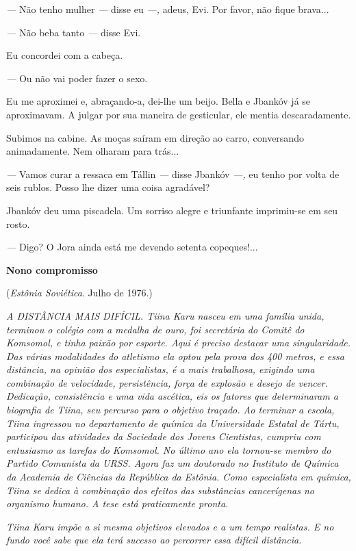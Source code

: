 \emph{---} Não tenho mulher \emph{---} disse eu \emph{---,} adeus, Evi.
Por favor, não fique brava...

\emph{---} Não beba tanto \emph{---} disse Evi.

Eu concordei com a cabeça.

\emph{---} Ou não vai poder fazer o sexo.

Eu me aproximei e, abraçando-a, dei-lhe um beijo. Bella e Jbankóv já se
aproximavam. A julgar por sua maneira de gesticular, ele mentia
descaradamente.

Subimos na cabine. As moças saíram em direção ao carro, conversando
animadamente. Nem olharam para trás...

\emph{---} Vamos curar a ressaca em Tállin \emph{---} disse Jbankóv
\emph{---,} eu tenho por volta de seis rublos. Posso lhe dizer uma coisa
agradável?

Jbankóv deu uma piscadela. Um sorriso alegre e triunfante imprimiu-se em
seu rosto.

\emph{---} Digo? O Jora ainda está me devendo setenta copeques!...

\textbf{Nono compromisso}

(\emph{Estônia Soviética}. Julho de 1976.)

\emph{A DISTÂNCIA MAIS DIFÍCIL. Tiina Karu nasceu em uma família unida,
terminou o colégio com a medalha de ouro, foi secretária do Comitê do
Komsomol, e tinha paixão por esporte. Aqui é preciso destacar uma
singularidade. Das várias modalidades do atletismo ela optou pela prova
dos 400 metros, e essa distância, na opinião dos especialistas, é a mais
trabalhosa, exigindo uma combinação de velocidade, persistência, força
de explosão e desejo de vencer. Dedicação, consistência e uma vida
ascética, eis os fatores que determinaram a biografia de Tiina, seu
percurso para o objetivo traçado. Ao terminar a escola, Tiina ingressou
no departamento de química da Universidade Estatal de Tártu, participou
das atividades da Sociedade dos Jovens Cientistas, cumpriu com
entusiasmo as tarefas do Komsomol. No último ano ela tornou-se membro do
Partido Comunista da URSS. Agora faz um doutorado no Instituto de
Química da Academia de Ciências da República da Estônia. Como
especialista em química, Tiina se dedica à combinação dos efeitos das
substâncias cancerígenas no organismo humano. A tese está praticamente
pronta.}

\emph{Tiina Karu impõe a si mesma objetivos elevados e a um tempo
realistas. E no fundo você sabe que ela terá sucesso ao percorrer essa
difícil distância.}

